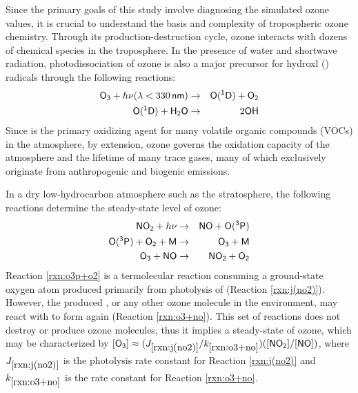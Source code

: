 Since the primary goals of this study involve diagnosing the simulated ozone values, it is crucial to understand the basis and complexity of tropospheric ozone chemistry. Through its production-destruction cycle, ozone interacts with dozens of chemical species in the troposphere. In the presence of water and shortwave radiation, photodissociation of ozone is also a major precursor for hydroxl () radicals through the following reactions:
\begin{eqnarray}
	\chem{O_3} + h\nu(\lambda<330\,\unit{nm}) &\rightarrow& \chem{O(^1D)} + \chem{O_2} \label{rxn:j(o3)} \\
	\chem{O(^1D)} + \chem{H_2O} &\rightarrow& 2\chem{OH} \label{rxn:o1d+h2o}
\end{eqnarray}
Since  is the primary oxidizing agent for many volatile organic compounds (VOCs) in the atmosphere, by extension, ozone governs the oxidation capacity of the atmosphere and the lifetime of many trace gases, many of which exclusively originate from anthropogenic and biogenic emissions.

In a dry low-hydrocarbon atmosphere such as the stratosphere, the following reactions determine the steady-state level of ozone:
\begin{eqnarray}
	\chem{NO_2} + h\nu &\rightarrow& \chem{NO} + \chem{O(^3P}) \label{rxn:j(no2)} \\
	\chem{O(^3P)} + \chem{O_2} + \chem{M} &\rightarrow& \chem{O_3} + \chem{M} \label{rxn:o3p+o2} \\
	\chem{O_3} + \chem{NO} &\rightarrow& \chem{NO_2} + \chem{O_2} \label{rxn:o3+no}
\end{eqnarray}
Reaction \ref{rxn:o3p+o2} is a termolecular reaction consuming a ground-state oxygen atom produced primarily from photolysis of  (Reaction \ref{rxn:j(no2)}). However, the produced , or any other ozone molecule in the environment, may react with  to form  again (Reaction \ref{rxn:o3+no}). This set of reactions does not destroy or produce ozone molecules, thus it implies a steady-state of ozone, which may be characterized by $[\chem{O_3}] \approx (J_{\ref{rxn:j(no2)}}/k_{\ref{rxn:o3+no}})([\chem{NO_2}]/[\chem{NO}])$, where $J_{\ref{rxn:j(no2)}}$ is the photolysis rate constant for Reaction \ref{rxn:j(no2)} and $k_{\ref{rxn:o3+no}}$ is the rate constant for Reaction \ref{rxn:o3+no}.

